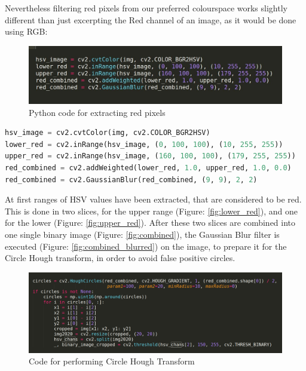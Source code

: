 Nevertheless filtering red pixels from our preferred colourspace works slightly different than just excerpting the Red channel of an image, as it would be done using RGB:
\begin{figure}[H]
	\minipage{\textwidth}
	\includegraphics[width=\linewidth]{images/filterredimage.jpg}
	\caption{Python code for extracting red pixels}\label{fig:filter_red_code}
	\endminipage\hfill
\end{figure}


\lstset{style=custompy}
\begin{lstlisting}[language=python]
hsv_image = cv2.cvtColor(img, cv2.COLOR_BGR2HSV)
lower_red = cv2.inRange(hsv_image, (0, 100, 100), (10, 255, 255))
upper_red = cv2.inRange(hsv_image, (160, 100, 100), (179, 255, 255))
red_combined = cv2.addWeighted(lower_red, 1.0, upper_red, 1.0, 0.0)
red_combined = cv2.GaussianBlur(red_combined, (9, 9), 2, 2)
\end{lstlisting}


At first ranges of HSV values have been extracted, that are considered to be red. This is done in two slices, for the upper range (Figure: \ref{fig:lower_red}), and one for the lower (Figure: \ref{fig:upper_red}). After these two slices are combined into one single binary image (Figure: \ref{fig:combined}), the Gaussian Blur filter is executed (Figure: \ref{fig:combined_blurred}) on the image, to prepare it for the Circle Hough transform, in order to avoid false positive circles.\newline
 
\begin{figure}[H]
	\minipage{\textwidth}
	\includegraphics[width=\linewidth]{images/detectioncode.png}
	\caption{Code for performing Circle Hough Transform}\label{fig:detection_code}
	\endminipage\hfill
\end{figure}


